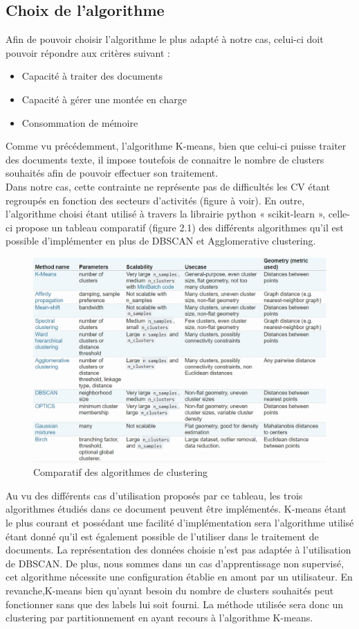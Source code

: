 \documentclass[memoire.tex]{subfiles}
\begin{document}
\subsection{Choix de l'algorithme}
Afin de pouvoir choisir l'algorithme le plus adapté à notre cas, celui-ci doit pouvoir répondre aux critères suivant : \begin{itemize}
\item Capacité à traiter des documents
\item Capacité à gérer une montée en charge
\item Consommation de mémoire 
\end{itemize}
Comme vu précédemment, l'algorithme K-means, bien que celui-ci puisse traiter des documents texte, il impose toutefois de connaitre le nombre de clusters souhaités afin de pouvoir effectuer son traitement.\\
Dans notre cas, cette contrainte ne représente pas de difficultés les CV étant regroupés en fonction des secteurs d’activités (figure à voir). En outre, l’algorithme choisi étant utilisé à travers la librairie python « scikit-learn », celle-ci propose un tableau comparatif (figure 2.1)  des différents algorithmes qu’il est possible d’implémenter en plus de DBSCAN et Agglomerative clustering.
	\begin{figure}[h!]
		\centerline{\includegraphics[scale=0.6]{img/algo_table.png}}
		\caption{Comparatif des algorithmes de clustering}
	\end{figure}
Au vu des différents cas d’utilisation proposés par ce tableau, les trois algorithmes étudiés dans ce document peuvent être implémentés. K-means étant le plus courant et possédant une facilité d’implémentation sera l’algorithme utilisé étant donné qu’il est également possible de l’utiliser dans le traitement de documents. La représentation des données choisie n'est pas adaptée à l'utilisation de DBSCAN. De plus, nous sommes dans un cas d'apprentissage non supervisé, cet algorithme nécessite une configuration établie en amont par un utilisateur. En revanche,K-means bien qu'ayant besoin du nombre de clusters souhaités peut fonctionner sans que des labels lui soit fourni. La méthode utilisée sera donc un clustering par partitionnement en ayant recours à l'algorithme K-means.
\end{document}
